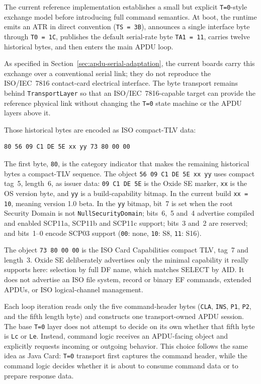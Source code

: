The current reference implementation establishes a small but explicit
\texttt{T=0}-style exchange model before introducing full command
semantics. At boot, the runtime emits an ATR in direct convention
(\texttt{TS = 3B}), announces a single interface byte through
\texttt{T0 = 1C}, publishes the default serial-rate byte
\texttt{TA1 = 11}, carries twelve historical bytes, and then enters the
main APDU loop.

As specified in Section~\ref{sec:apdu-serial-adaptation}, the current boards carry
this exchange over a conventional serial link; they do not reproduce the
ISO/IEC~7816 contact-card electrical interface. The byte transport remains
behind \texttt{TransportLayer} so that an ISO/IEC~7816-capable target can
provide the reference physical link without changing the \texttt{T=0} state
machine or the APDU layers above it.

Those historical bytes are encoded as ISO compact-TLV data:
\begin{verbatim}
80 56 09 C1 DE 5E xx yy 73 80 00 00
\end{verbatim}
The first byte, \texttt{80}, is the category indicator that makes the
remaining historical bytes a compact-TLV sequence. The object
\texttt{56 09 C1 DE 5E xx yy} uses compact tag~5, length~6, as issuer data:
\texttt{09 C1 DE 5E} is the Oxide SE marker, \texttt{xx} is the
OS version byte, and \texttt{yy} is a build-capability bitmap.
In the current build \texttt{xx = 10}, meaning version 1.0 beta. In the
\texttt{yy} bitmap, bit~7
is set when the root Security Domain is
not \texttt{NullSecurityDomain}; bits~6,~5 and~4 advertise compiled and
enabled SCP11a, SCP11b and SCP11c support; bits~3 and~2 are reserved;
and bits~1--0 encode SCP03 support (\texttt{00}: none, \texttt{10}:
S8, \texttt{11}: S16).

The object \texttt{73 80 00 00} is the ISO Card Capabilities compact
TLV, tag~7 and length~3. Oxide SE deliberately advertises only the
minimal capability it really supports here: selection by full DF name,
which matches SELECT by AID. It does not advertise an ISO file system,
record or binary EF commands, extended APDUs, or ISO logical-channel
management.

Each loop iteration reads only the five command-header bytes
(\texttt{CLA}, \texttt{INS}, \texttt{P1}, \texttt{P2}, and the fifth
length byte) and constructs one transport-owned APDU session. The base
\texttt{T=0} layer does not attempt to decide on its own whether that
fifth byte is
\texttt{Lc} or \texttt{Le}. Instead, command logic receives an
APDU-facing object and explicitly requests incoming or outgoing
behavior. This choice follows the same idea as Java Card:
\texttt{T=0} transport first captures the command header, while the
command logic decides whether it is about to consume command data or to
prepare response data.

